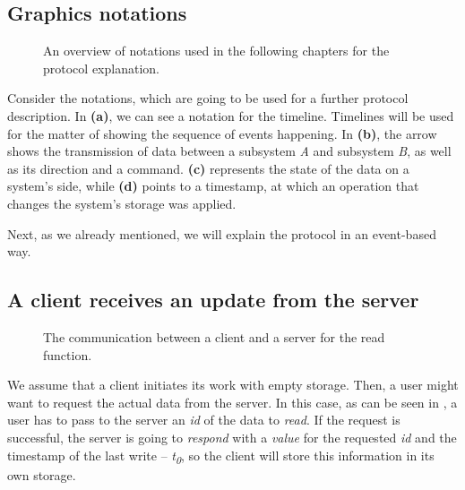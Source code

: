 \subsection*{Graphics notations}

\begin{figure}[!htb]
    \centering
    \def\svgwidth{0.35\linewidth}
    \subfloat[]{{}}%
    \qquad
    \def\svgwidth{0.35\linewidth}
    \subfloat[]{{}}%
 \def\svgwidth{0.35\linewidth}
    \subfloat[]{{}}%
    \qquad
 \def\svgwidth{0.35\linewidth}
    \subfloat[]{{}}%
    \qquad
    \caption{An overview of notations used in the following chapters for the protocol explanation.}%
    \label{fig:notations}%
\end{figure}

Consider the notations, which are going to be used for a further protocol description. In  \textbf{(a)}, we can see a notation for the timeline. Timelines will be used for the matter of showing the sequence of events happening. In  \textbf{(b)}, the arrow shows the transmission of data between a subsystem \textit{A} and subsystem \textit{B}, as well as its direction and a command.  \textbf{(c)} represents the state of the data on a system's side, while  \textbf{(d)} points to a timestamp, at which an operation that changes the system's storage was applied.

Next, as we already mentioned, we will explain the protocol in an event-based way. 

\subsection*{A client receives an update from the server}

\begin{figure}[!htb]
    \begin{center}
    \def\svgwidth{\linewidth}
    
    \caption {The communication between a client and a server for the read function.}
    \label{fig:design2}
\end{center}
\end{figure}

We assume that a client initiates its work with empty storage. Then, a user might want to request the actual data from the server. In this case, as can be seen in , a user has to pass to the server an \textit{id} of the data to \textit{read}. If the request is successful, the server is going to \textit{respond} with a \textit{value} for the requested \textit{id} and the timestamp of the last write -- \textit{t\textsubscript{0}}, so the client will store this information in its own storage.

